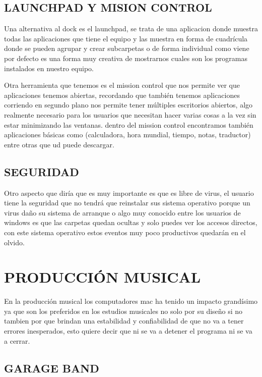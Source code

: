 \subsection*{LAUNCHPAD Y MISION CONTROL}

Una alternativa al dock es el launchpad, se trata de una
aplicacion donde muestra todas las aplicaciones que tiene el
equipo y las muestra en forma de cuadrícula donde se pueden
agrupar y crear subcarpetas o de forma individual como viene
por defecto es una forma muy creativa de mostrarnos cuales son
los programas instalados en nuestro equipo.

Otra herramienta que tenemos es el mission control que nos
permite ver que aplicaciones tenemos abiertas, recordando que
también tenemos aplicaciones corriendo en segundo plano nos
permite tener múltiples escritorios abiertos, algo realmente
necesario para los usuarios que necesitan hacer varias cosas a la
vez sin estar minimizando las ventanas. dentro del mission
control encontramos también aplicaciones básicas como
(calculadora, hora mundial, tiempo, notas, traductor) entre otras
que ud puede descargar.

\subsection*{SEGURIDAD}

Otro aspecto que diría que es muy importante es que es libre de
virus, el usuario tiene la seguridad que no tendrá que reinstalar
sus sistema operativo porque un virus daño su sistema de
arranque o algo muy conocido entre los usuarios de windows es
que las carpetas quedan ocultas y solo puedes ver los accesos
directos, con este sistema operativo estos eventos muy poco
productivos quedarán en el olvido.

\section*{PRODUCCIÓN MUSICAL}

En la producción musical los computadores mac ha tenido un
impacto grandísimo ya que son los preferidos en los estudios
musicales no solo por su diseño si no tambien por que brindan
una estabilidad y confiabilidad de que no va a tener errores
inesperados, esto quiere decir que ni se va a detener el
programa ni se va a cerrar.

\subsection*{GARAGE BAND}

